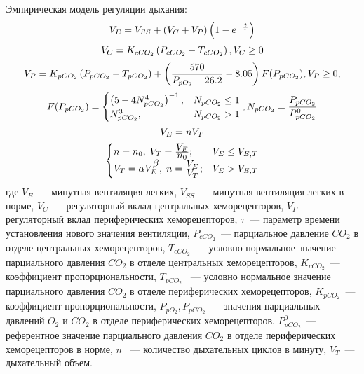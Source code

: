 Эмпирическая модель регуляции дыхания:
\begin{equation}
V_{E}=V_{SS}+\left(V_{C}+V_{P}\right)\left(1-e^{-\frac{t}{\tau}}\right) \notag
\end{equation}
\begin{equation}
V_{C}=K_{cCO_{2}}\left(P_{cCO_{2}}-T_{cCO_{2}} \right), V_{C}\ge 0 \notag
\end{equation}
\begin{equation}
V_{P}=K_{pCO_{2}}\left(P_{pCO_{2}}-T_{pCO_{2}} \right)+\left(\frac{570}{P_{pO_{2}}-26.2}-8.05\right)F(P_{pCO_{2}}), V_{P}\ge 0, \notag
\end{equation}
\begin{equation}
F(P_{pCO_{2}})=\begin{cases}
\left(5-4N_{pCO_{2}}^4 \right)^{-1}, & N_{pCO_{2}}\le 1 \\
N_{pCO_{2}}^3, & N_{pCO_{2}}> 1 
\end{cases}, 
N_{pCO_{2}}=\frac{P_{pCO_{2}}}{P_{pCO_{2}}^0} \notag
\end{equation}
\begin{equation}
V_{E}=nV_{T} \notag
\end{equation}
\begin{equation} 
\begin{cases}
n=n_{0},\; V_{T}=\frac{\displaystyle V_{E}}{\displaystyle n_{0}}; & V_{E} \le V_{E,T}  \\
V_{T}=\alpha V_{E}^{\displaystyle \beta},\; n= \frac{\displaystyle V_{E}}{\displaystyle V_{T}}; & V_{E} > V_{E,T}
\end{cases}\notag
\end{equation}
где \( V_{E}\)~--- минутная вентиляция легких, 
\( V_{SS}\)~--- минутная вентиляция легких в норме, 
\( V_{C}\)~--- регуляторный вклад центральных хеморецепторов,
\( V_{P}\)~--- регуляторный вклад периферических хеморецепторов,
\( \tau\)~--- параметр времени установления нового значения вентиляции, \( P_{cCO_{2}}\)~--- парциальное давление $CO_{2}$ в отделе центральных хеморецепторов, 
\( T_{cCO_{2}}\)~--- условно нормальное значение парциального давления $CO_{2}$ в отделе центральных хеморецепторов, 
\( K_{cCO_{2}}\)~--- коэффициент пропорциональности, \( T_{pCO_{2}}\) ~--- условно нормальное значение парциального давления $CO_{2}$ в отделе периферических хеморецепторов, 
\( K_{pCO_{2}}\)~--- коэффициент пропорциональности, 
\( P_{pO_{2}}, P_{pCO_{2}}\)~--- значения парциальных давлений $O_{2}$ и $CO_{2}$ в отделе периферических хеморецепторов,
\( P_{pCO_{2}}^0\)~--- референтное значение парциального давления $CO_{2}$ в отделе периферических хеморецепторов в норме, \( n\)  ~---  количество дыхательных циклов в минуту, \( V_{T}\)~--- дыхательный объем.

